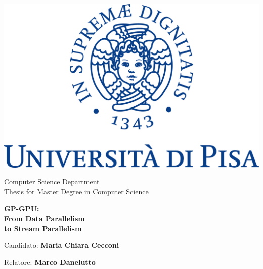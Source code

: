 
\begin{titlepage}
	\begin{center}	
		\includegraphics{images/logo_unipi}
		
		\vspace*{1cm}
		\normalsize{					
			Computer Science Department\\
			\vspace{0.5cm}		
			Thesis for Master Degree in Computer Science
		}
		\vspace*{2cm}
		
		
		\huge{ \textbf{GP-GPU: \\  From 	 Data Parallelism \\ to Stream  Parallelism} }
		
		
		
		\vspace{1.5cm}
	\end{center}
	
	\vfill
	\vspace*{2cm}
	
	\begin{flushright}
		\Large{	
			Candidato: \textbf{Maria Chiara Cecconi}
			
			\vspace{0.5cm}
			
			Relatore: \textbf{Marco Danelutto}
		}
	\end{flushright}				
\end{titlepage}
%	